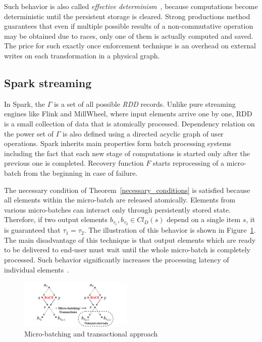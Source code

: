 Such behavior is also called {\em effective determinism}~\cite{akidau2018streaming}, because computations become deterministic until the persistent storage is cleared. Strong productions method guarantees that even if multiple possible results of a non-commutative operation may be obtained due to races, only one of them is actually computed and saved. The price for such exactly once enforcement technique is an overhead on external writes on each transformation in a physical graph.

\subsection{Spark streaming}

In Spark, the  $\Gamma$ is a set of all possible {\em RDD} records. Unlike pure streaming engines like Flink and MillWheel, where input elements arrive one by one, RDD is a small collection of data that is atomically processed. Dependency relation on the power set of $\Gamma$ is also defined using a directed acyclic graph of user operations. Spark inherits main properties form batch processing systems including the fact that each new stage of computations is started only after the previous one is completed. Recovery function $F$ starts reprocessing of a micro-batch from the beginning in case of failure.

The necessary condition of Theorem~\ref{necessary_conditions} is satisfied because all elements within the micro-batch are released atomically. Elements from various micro-batches can interact only through persistently stored state. Therefore, if two output elements $b_{\tau_1},b_{\tau_2} \in Cl_D(s)$ depend on a single item $s$, it is guaranteed that $\tau_1=\tau_2$. The illustration of this behavior is shown in Figure~\ref{spark_flink}. The main disadvantage of this technique is that output elements which are ready to be delivered to end-user must wait until the whole micro-batch is completely processed. Such behavior significantly increases the processing latency of individual elements~\cite{karimov2018benchmarking}.
 
\begin{figure}[htbp]
  \centering
  \includegraphics[width=0.48\textwidth]{pics/spark-flink}
  \caption{Micro-batching and transactional approach}
  \label{spark_flink}
\end{figure}
 
